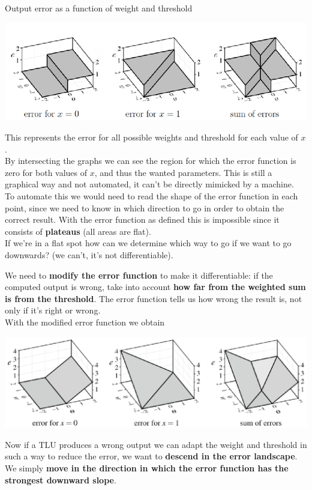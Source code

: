 Output error as a function of weight and threshold
\begin{center}
	\includegraphics[width=0.85\columnwidth]{img/NN/error1}
\end{center}
This represents the error for all possible weights and threshold for each value of $x$.\\

By intersecting the graphs we can see the region for which the error function is zero for both values of $x$, and thus the wanted parameters. This is still a graphical way and not automated, it can't be directly mimicked by a machine.\\

To automate this we would need to read the shape of the error function in each point, since we need to know in which direction to go in order to obtain the correct result. With the error function as defined this is impossible since it consists of \textbf{plateaus} (all areas are flat). \\
If we're in a flat spot how can we determine which way to go if we want to go downwards? (we can't, it's not differentiable).\\

\newpage

We need to \textbf{modify the error function} to make it differentiable: if the computed output is wrong, take into account \textbf{how far from the weighted sum is from the threshold}. The error function tells us how wrong the result is, not only if it's right or wrong.\\

With the modified error function we obtain
\begin{center}
	\includegraphics[width=0.85\columnwidth]{img/NN/error2}
\end{center}
Now if a TLU produces a wrong output we can adapt the weight and threshold in such a way to reduce the error, we want to \textbf{descend in the error landscape}. We simply \textbf{move in the direction in which the error function has the strongest downward slope}.\\

